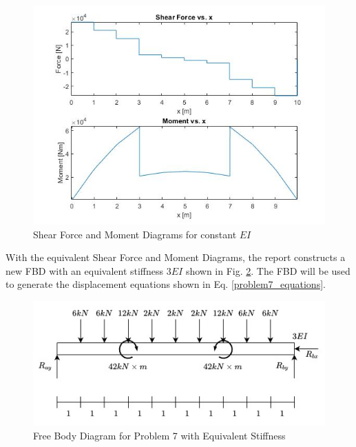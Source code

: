 \documentclass[a4paper]{article}
\begin{document}
\begin{figure}[h]
\includegraphics[width=\textwidth]{results/eq7.jpg}
\caption{Shear Force and Moment Diagrams for constant $EI$}
\label{eq7}
\end{figure}

With the equivalent Shear Force and Moment Diagrams, the report constructs a new FBD with an equivalent stiffness $3EI$ shown in Fig. \ref{FBD_7_new}. The FBD will be used to generate the displacement equations shown in Eq. \ref{problem7_equations}.

\begin{figure}[h]
\includegraphics[width=\textwidth]{FBD/FBD_7_new.jpg}
\caption{Free Body Diagram for Problem 7 with Equivalent Stiffness}
\label{FBD_7_new}
\end{figure}
\end{document}
